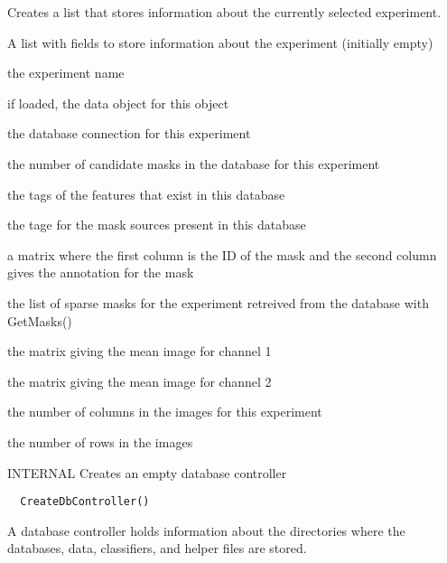 \documentclass[a4paper]{book}
\begin{document}
%
\begin{Details}\relax
Creates a list that stores information about the
currently selected experiment.
\end{Details}
%
\begin{Value}
A list with fields to store information about the
experiment (initially empty) \begin{ldescription}
\item[\code{name}] the experiment
name\item[\code{data}] if loaded, the data object for this
object\item[\code{db}] the database connection for this
experiment\item[\code{nmasks}] the number of candidate masks
in the database for this experiment\item[\code{features}] the
tags of the features that exist in this database
\item[\code{sources}] the tage for the mask sources present in
this database\item[\code{selmat}] a matrix where the first
column is the ID of the mask and the second column gives
the annotation for the mask\item[\code{sms}] the list of
sparse masks for the experiment retreived from the
database with GetMasks()\item[\code{mimg1}] the matrix giving
the mean image for channel 1\item[\code{mimg2}] the matrix
giving the mean image for channel 2\item[\code{nx}] the number
of columns in the images for this experiment
\item[\code{ny}] the number of rows in the images
\end{ldescription}
\end{Value}
%
\begin{Description}\relax
INTERNAL Creates an empty database controller
\end{Description}
%
\begin{Usage}
\begin{verbatim}
  CreateDbController()
\end{verbatim}
\end{Usage}
%
\begin{Details}\relax
A database controller holds information about the
directories where the databases, data, classifiers, and
helper files are stored. \\{}
\end{Details}
\end{document}
